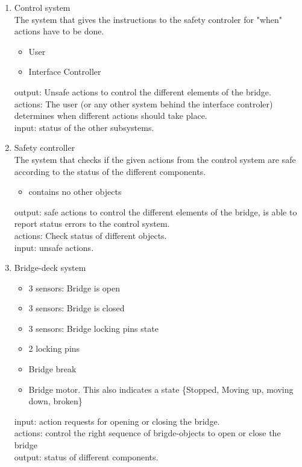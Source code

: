 \documentclass[a4paper]{article}
\begin{document}
\begin{enumerate}

\item{Control system} \\
The system that gives the instructions to the safety controler for "when" actions have to be done. 
\begin{itemize}
\item{User}
\item{Interface Controller} 
\end{itemize}
output: Unsafe actions to control the different elements of the bridge. \\
actions: The user (or any other system behind the interface controler) determines when different actions should take place. \\
input: status of the other subsystems. 

\item{Safety controller} \\
The system that checks if the given actions from the control system are safe according to the status of the different components. 
\begin{itemize}
\item{contains no other objects} 
\end{itemize}
output: safe actions to control the different elements of the bridge, is able to report status errors to the control system. \\
actions: Check status of different objects. \\
input: unsafe actions. 

\item{Bridge-deck system}
\begin{itemize}
\item{3 sensors: Bridge is open}
\item{3 sensors: Bridge is closed}
\item{3 sensors: Bridge locking pins state}
\item{2 locking pins}
\item{Bridge break}\item{Bridge motor. This also indicates a state \{Stopped, Moving up, moving down, broken\}}
\end{itemize}
input: action requests for opening or closing the bridge. \\
actions: control the right sequence of brigde-objects to open or close the bridge\\
output: status of different components. 


\end{enumerate}
\end{document}
